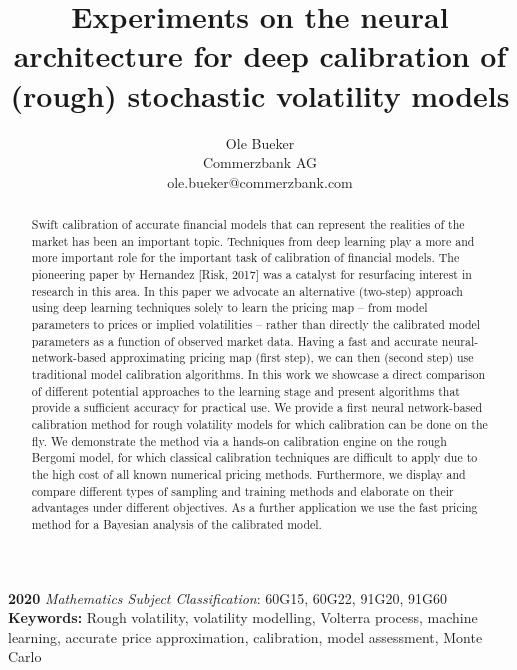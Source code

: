 \documentclass{article}
\theoremstyle{remark}
\begin{document}
\title{Experiments on the neural architecture for deep calibration of (rough) stochastic volatility models}

\renewcommand\footnotemark{}
\author{Ole Bueker\\
\large{Commerzbank AG}\\
\normalsize{ole.bueker@commerzbank.com}
}
\maketitle

\begin{abstract}
  Swift calibration of accurate financial models that can represent the realities of the market has been an important topic.
  Techniques from deep learning play a more and more important role for the important task of calibration of financial models. The pioneering paper by Hernandez [Risk, 2017] was a catalyst for resurfacing interest in research in this area. In this paper we
  advocate an alternative (two-step) approach using deep learning techniques solely to learn the pricing map -- from
  model parameters to prices or implied volatilities -- rather than directly the calibrated model parameters as a function of observed market data.  Having a fast and accurate neural-network-based approximating pricing map (first step), we can then (second step) use traditional model calibration algorithms. In this work we showcase a direct comparison of different potential approaches to the learning stage and present algorithms that provide a sufficient accuracy for practical use.
  We provide a first neural network-based calibration method for rough volatility models for which calibration can be done on the fly.
  We demonstrate the method via a hands-on calibration engine on the rough Bergomi model, for which classical
  calibration techniques are difficult to apply due to the high cost of all known numerical pricing methods.  Furthermore, we display and compare different types of sampling and training methods and elaborate on their advantages under different objectives. As a further application we use the fast pricing method for a Bayesian analysis of the calibrated model.
\end{abstract}

\noindent \textbf{2020 }\textit{Mathematics Subject Classification}: 60G15, 60G22, 91G20, 91G60\\
\noindent \textbf{Keywords: }Rough volatility, volatility modelling, Volterra process, machine learning, accurate price approximation, calibration, model assessment, Monte Carlo
\end{document}
